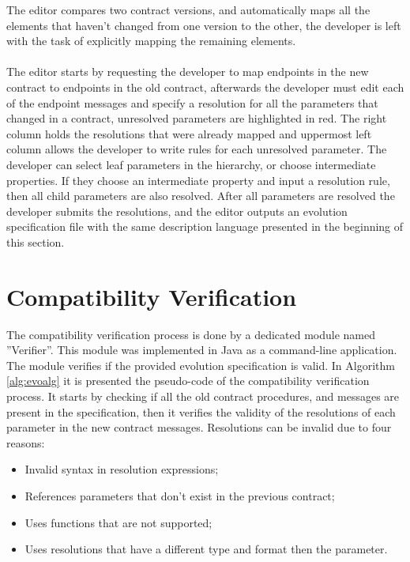 The editor compares two contract versions,
and automatically maps all the elements that haven't changed from one version to the other, the
developer is left with the task of explicitly mapping the remaining elements.

\paragraph{}

The editor starts by requesting the developer to map endpoints in the new contract to endpoints in the old contract,
afterwards the developer must edit each of the endpoint messages and specify a resolution for all the parameters that changed
in a contract, unresolved parameters are highlighted in red.
The right column holds the resolutions that were already mapped and uppermost left column allows the developer to write rules
for each unresolved parameter.
The developer can select leaf parameters in the hierarchy, or choose intermediate properties.
If they choose an intermediate property and input a resolution rule, then all child parameters are also resolved.
After all parameters are resolved the developer submits the resolutions, and
the editor outputs an evolution specification file with the same description language presented in the beginning of this section.

\section{Compatibility Verification} %
\label{sec:compatibility_verification}

The compatibility verification process is done by a dedicated module named ''Verifier''.
This module was implemented in Java as a command-line application.
The module verifies if the provided evolution specification is valid.
In Algorithm \ref{alg:evoalg} it is presented the pseudo-code of the compatibility verification process.
It starts by checking if all the old contract procedures, and messages are present in the specification,
then it verifies the validity of the resolutions of each parameter in the new contract messages.
Resolutions can be invalid due to four reasons:

\begin{itemize}
    \setlength\itemsep{0em}
    \item Invalid syntax in resolution expressions;
    \item References parameters that don't exist in the previous contract;
    \item Uses functions that are not supported;
    \item Uses resolutions that have a different type and format then the parameter.
\end{itemize}

